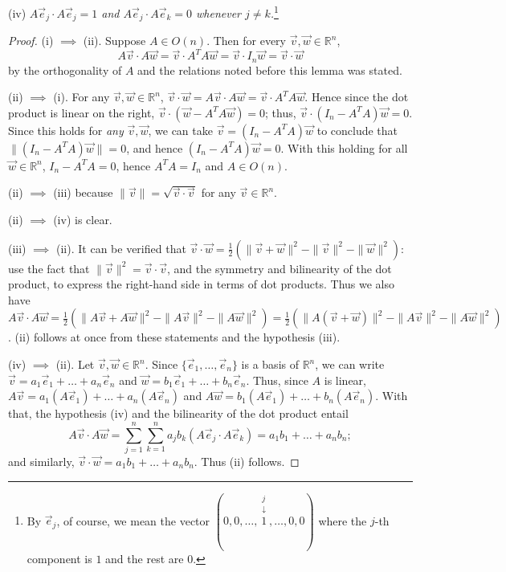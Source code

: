 \documentclass[leqno]{book}
\begin{document}
(iv) \emph{$A\vec e_j\cdot A\vec e_j=1$ and $A\vec e_j\cdot A\vec e_k=0$ whenever $j\ne k$.}\footnote{By $\vec e_j$, of course, we mean the vector $(0,0,\dots,\overset{\begin{matrix}j\\\downarrow\end{matrix}}1,\dots,0,0)$ where the $j$-th component is $1$ and the rest are $0$.}
\begin{proof}
(i) $\implies$ (ii). Suppose $A\in O(n)$.  Then for every $\vec v,\vec w\in\mathbb R^n$,
$$A\vec v\cdot A\vec w=\vec v\cdot A^TA\vec w=\vec v\cdot I_n\vec w=\vec v\cdot\vec w$$
by the orthogonality of $A$ and the relations noted before this lemma was stated.

(ii) $\implies$ (i). For any $\vec v,\vec w\in\mathbb R^n$, $\vec v\cdot\vec w=A\vec v\cdot A\vec w=\vec v\cdot A^TA\vec w$.  Hence since the dot product is linear on the right, $\vec v\cdot(\vec w-A^TA\vec w)=0$; thus, $\vec v\cdot(I_n-A^TA)\vec w=0$.  Since this holds for \emph{any} $\vec v,\vec w$, we can take $\vec v=(I_n-A^TA)\vec w$ to conclude that $\|(I_n-A^TA)\vec w\|=0$, and hence $(I_n-A^TA)\vec w=0$.  With this holding for all $\vec w\in\mathbb R^n$, $I_n-A^TA=0$, hence $A^TA=I_n$ and $A\in O(n)$.

(ii) $\implies$ (iii) because $\|\vec v\|=\sqrt{\vec v\cdot\vec v}$ for any $\vec v\in\mathbb R^n$.

(ii) $\implies$ (iv) is clear.

(iii) $\implies$ (ii). It can be verified that $\vec v\cdot\vec w=\frac 12(\|\vec v+\vec w\|^2-\|\vec v\|^2-\|\vec w\|^2)$: use the fact that $\|\vec v\|^2=\vec v\cdot\vec v$, and the symmetry and bilinearity of the dot product, to express the right-hand side in terms of dot products.  Thus we also have $A\vec v\cdot A\vec w=\frac 12(\|A\vec v+A\vec w\|^2-\|A\vec v\|^2-\|A\vec w\|^2)=\frac 12(\|A(\vec v+\vec w)\|^2-\|A\vec v\|^2-\|A\vec w\|^2)$.  (ii) follows at once from these statements and the hypothesis (iii).

(iv) $\implies$ (ii). Let $\vec v,\vec w\in\mathbb R^n$.  Since $\{\vec e_1,\dots,\vec e_n\}$ is a basis of $\mathbb R^n$, we can write $\vec v=a_1\vec e_1+\dots+a_n\vec e_n$ and $\vec w=b_1\vec e_1+\dots+b_n\vec e_n$.  Thus, since $A$ is linear, $A\vec v=a_1(A\vec e_1)+\dots+a_n(A\vec e_n)$ and $A\vec w=b_1(A\vec e_1)+\dots+b_n(A\vec e_n)$.  With that, the hypothesis (iv) and the bilinearity of the dot product entail
$$A\vec v\cdot A\vec w=\sum_{j=1}^n\sum_{k=1}^n a_jb_k(A\vec e_j\cdot A\vec e_k)=a_1b_1+\dots+a_nb_n;$$
and similarly, $\vec v\cdot\vec w=a_1b_1+\dots+a_nb_n$.  Thus (ii) follows.
\end{proof}
\end{document}
